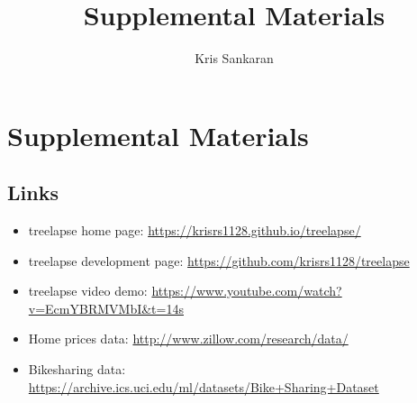 \documentclass{article}
\title{Supplemental Materials}
\author{Kris Sankaran}
\begin{document}
\maketitle

\section{Supplemental Materials}

\subsection{Links}
\label{sec:supp_links}

\begin{itemize}
\item treelapse home page: \url{https://krisrs1128.github.io/treelapse/}
\item treelapse development page: \url{https://github.com/krisrs1128/treelapse}
\item treelapse video demo: \url{https://www.youtube.com/watch?v=EcmYBRMVMbI&t=14s}
\item Home prices data: \url{http://www.zillow.com/research/data/}
\item Bikesharing data: \url{https://archive.ics.uci.edu/ml/datasets/Bike+Sharing+Dataset}
\end{itemize}
\end{document}
